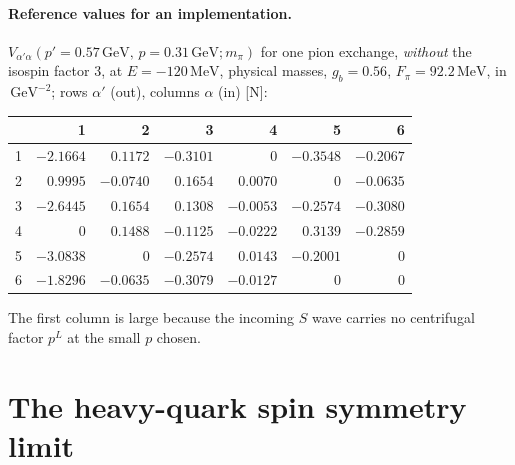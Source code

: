 \documentclass[11pt,a4paper]{article}
\newcommand{\tagN}{\textcolor{red!70!black}{\textsf{\small[N]}}}
\newcommand{\GeV}{\,\mathrm{GeV}}
\newcommand{\MeV}{\,\mathrm{MeV}}
\begin{document}
\paragraph{Reference values for an implementation.} $V_{\alpha'\alpha}(p'=0.57\GeV,\,p=0.31\GeV;m_\pi)$ for one pion exchange, \emph{without} the isospin factor 3, at $E=-120\MeV$, physical masses, $g_b=0.56$, $F_\pi=92.2\MeV$, in $\GeV^{-2}$; rows $\alpha'$ (out), columns $\alpha$ (in) \tagN:
\begin{center}
\small
\begin{tabular}{c|rrrrrr}
& 1 & 2 & 3 & 4 & 5 & 6\\
\hline
1 & $-2.1664$ & $0.1172$ & $-0.3101$ & $0$ & $-0.3548$ & $-0.2067$\\
2 & $0.9995$ & $-0.0740$ & $0.1654$ & $0.0070$ & $0$ & $-0.0635$\\
3 & $-2.6445$ & $0.1654$ & $0.1308$ & $-0.0053$ & $-0.2574$ & $-0.3080$\\
4 & $0$ & $0.1488$ & $-0.1125$ & $-0.0222$ & $0.3139$ & $-0.2859$\\
5 & $-3.0838$ & $0$ & $-0.2574$ & $0.0143$ & $-0.2001$ & $0$\\
6 & $-1.8296$ & $-0.0635$ & $-0.3079$ & $-0.0127$ & $0$ & $0$\\
\end{tabular}
\end{center}
The first column is large because the incoming $S$ wave carries no centrifugal factor $p^L$ at the small $p$ chosen.

\section{The heavy-quark spin symmetry limit}
\label{sec:hqss}
\end{document}
